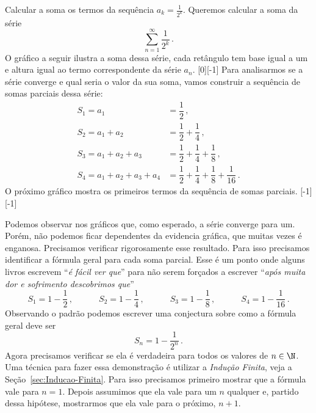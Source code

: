 \begin{example}
	Calcular a soma os termos da sequência \( a_k = \frac{1}{2^{k}} \).
	\solution
	Queremos calcular a soma da série
	\[
		\sum_{n=1}^{\infty} \frac{1}{2^k}   \,.
	\]
  O gráfico a seguir ilustra a soma dessa série, cada retângulo tem base igual a um
  e altura igual ao termo correspondente da série $a_n$.
  [0][-1]
	Para analisarmos se a série converge e qual seria o valor da sua soma, vamos construir a
	sequência de somas parciais dessa série:
	\[
		\begin{array}{ll}
			S_1 = a_1                   & = \dfrac{1}{2}                                               \,,\\[3mm]
			S_2 = a_1 + a_2             & = \dfrac{1}{2} + \dfrac{1}{4}                                \,,\\[3mm]
			S_3 = a_1 + a_2 + a_3       & = \dfrac{1}{2} + \dfrac{1}{4} + \dfrac{1}{8}                 \,,\\[3mm]
			S_4 = a_1 + a_2 + a_3 + a_4 & = \dfrac{1}{2} + \dfrac{1}{4} + \dfrac{1}{8} + \dfrac{1}{16} \,.
		\end{array}
	\]
  O próximo gráfico mostra os primeiros termos da sequência de somas parciais.
  [-1][-1]

  Podemos observar nos gráficos que, como esperado, a série converge para um.
  Porém, não podemos ficar dependentes da evidencia gráfica, que muitas vezes
  é enganosa. Precisamos verificar rigorosamente esse resultado.
  Para isso precisamos identificar a fórmula geral para cada soma parcial.
	Esse é um ponto onde alguns livros escrevem ``\textit{é fácil ver que}''
	para não serem forçados a escrever ``\textit{após muita dor e sofrimento descobrimos que}''
	\[
		S_1 = 1 - \dfrac{1}{2}     \,,\qquad\quad
		S_2 = 1 - \dfrac{1}{4}     \,,\qquad\quad
		S_3 = 1 - \dfrac{1}{8}     \,,\qquad\quad
		S_4 = 1 - \dfrac{1}{16}    \,.
	\]
	Observando o padrão podemos escrever uma conjectura sobre como a fórmula geral deve ser
	\[
		S_n = 1 - \frac{1}{2^{n}} \,.
	\]
	Agora precisamos verificar se ela é verdadeira para todos os valores de $n\in\N$.
	Uma técnica para fazer essa demonstração é utilizar a
	\emph{Indução Finita}, veja a Seção~\ref{sec:Inducao-Finita}.
	Para isso precisamos primeiro mostrar
	que a fórmula vale para $n=1$. Depois assumimos que ela vale para um $n$ qualquer
	e, partido dessa hipótese, mostrarmos que ela vale para o próximo, $n+1$.


\end{example}
